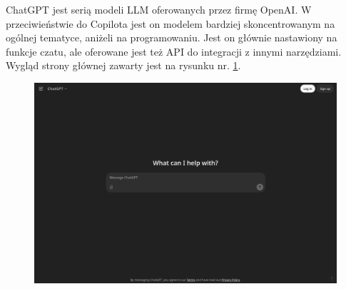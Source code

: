 ChatGPT\cite{chatgptsite} jest serią modeli LLM oferowanych przez firmę OpenAI. W przeciwieństwie do Copilota jest on modelem bardziej skoncentrowanym na ogólnej tematyce, aniżeli na programowaniu. Jest on głównie nastawiony na funkcje czatu, ale oferowane jest też API do integracji z innymi narzędziami. Wygląd strony głównej zawarty jest na rysunku nr. \ref{fig:chatgptsite}.

\begin{figure}[H]
	\centering
	\includegraphics[width=1\textwidth]{images/chatgpt_site.png}
	\caption{}
	\label{fig:chatgptsite}
\end{figure}
